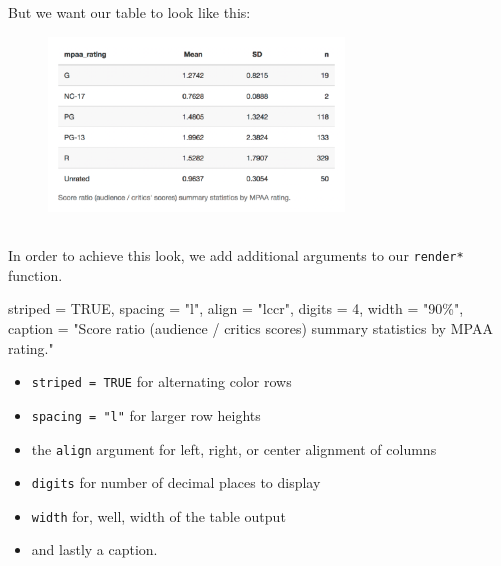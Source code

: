 \documentclass[
  letterpaper,
  DIV=11,
  numbers=noendperiod]{scrreprt}
\newenvironment{Shaded}{\begin{snugshade}}{\end{snugshade}}
\newcommand{\ConstantTok}[1]{\textcolor[rgb]{0.56,0.35,0.01}{#1}}
\newcommand{\DecValTok}[1]{\textcolor[rgb]{0.68,0.00,0.00}{#1}}
\newcommand{\NormalTok}[1]{\textcolor[rgb]{0.00,0.46,0.62}{#1}}
\newcommand{\OtherTok}[1]{\textcolor[rgb]{0.00,0.46,0.62}{#1}}
\newcommand{\StringTok}[1]{\textcolor[rgb]{0.13,0.47,0.30}{#1}}
\providecommand{\tightlist}{%
  \setlength{\itemsep}{0pt}\setlength{\parskip}{0pt}}
\begin{document}
But we want our table to look like this:

\begin{figure}

{\centering \includegraphics[width=0.7\textwidth,height=\textheight]{./images/summary-table-styled.png}

}

\end{figure}

\hypertarget{section-25}{%
\subsection{}\label{section-25}}

In order to achieve this look, we add additional arguments to our
\texttt{render*} function.

\begin{Shaded}
\begin{Highlighting}[]
\NormalTok{striped }\OtherTok{=} \ConstantTok{TRUE}\NormalTok{, spacing }\OtherTok{=} \StringTok{"l"}\NormalTok{, align }\OtherTok{=} \StringTok{"lccr"}\NormalTok{, digits }\OtherTok{=} \DecValTok{4}\NormalTok{, width }\OtherTok{=} \StringTok{"90\%"}\NormalTok{,}
\NormalTok{caption }\OtherTok{=} \StringTok{"Score ratio (audience / critics\textquotesingle{} scores) summary statistics by MPAA rating."}
\end{Highlighting}
\end{Shaded}

\begin{itemize}
\tightlist
\item
  \texttt{striped\ =\ TRUE} for alternating color rows
\item
  \texttt{spacing\ =\ "l"} for larger row heights
\item
  the \texttt{align} argument for left, right, or center alignment of
  columns
\item
  \texttt{digits} for number of decimal places to display
\item
  \texttt{width} for, well, width of the table output
\item
  and lastly a caption.
\end{itemize}
\end{document}
